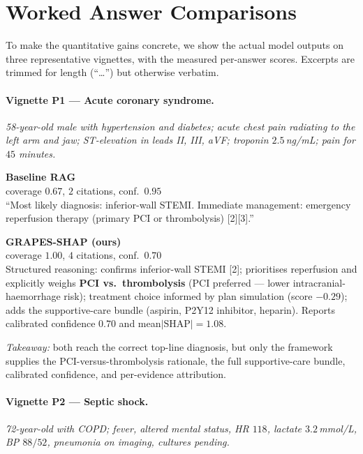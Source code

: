 \documentclass[11pt,a4paper]{report}
\begin{document}
\section{Worked Answer Comparisons}
\label{sec:demo}
To make the quantitative gains concrete, we show the actual model outputs on
three representative vignettes, with the measured per-answer scores. Excerpts are
trimmed for length (``\ldots'') but otherwise verbatim.

\paragraph{Vignette P1 --- Acute coronary syndrome.}
\emph{58-year-old male with hypertension and diabetes; acute chest pain
radiating to the left arm and jaw; ST-elevation in leads II, III, aVF; troponin
$2.5$\,ng/mL; pain for $45$ minutes.}

\noindent
\begin{minipage}[t]{0.47\textwidth}
\footnotesize
\textbf{Baseline RAG}\\{\scriptsize coverage $0.67$, $2$ citations, conf.\ $0.95$}\\[3pt]
``Most likely diagnosis: inferior-wall STEMI. Immediate management: emergency
reperfusion therapy (primary PCI or thrombolysis) [2][3].''
\end{minipage}\hfill
\begin{minipage}[t]{0.47\textwidth}
\footnotesize
\textbf{GRAPES-SHAP (ours)}\\{\scriptsize coverage $1.00$, $4$ citations, conf.\ $0.70$}\\[3pt]
Structured reasoning: confirms inferior-wall STEMI [2]; prioritises reperfusion
and explicitly weighs \textbf{PCI vs.\ thrombolysis} (PCI preferred --- lower
intracranial-haemorrhage risk); treatment choice informed by plan simulation
(score $-0.29$); adds the supportive-care bundle (aspirin, P2Y12 inhibitor,
heparin). Reports calibrated confidence $0.70$ and mean$|\text{SHAP}|=1.08$.
\end{minipage}

\smallskip
\noindent\textit{Takeaway:} both reach the correct top-line diagnosis, but only
the framework supplies the PCI-versus-thrombolysis rationale, the full
supportive-care bundle, calibrated confidence, and per-evidence attribution.

\paragraph{Vignette P2 --- Septic shock.}
\emph{72-year-old with COPD; fever, altered mental status, HR $118$, lactate
$3.2$\,mmol/L, BP $88/52$, pneumonia on imaging, cultures pending.}
\end{document}
